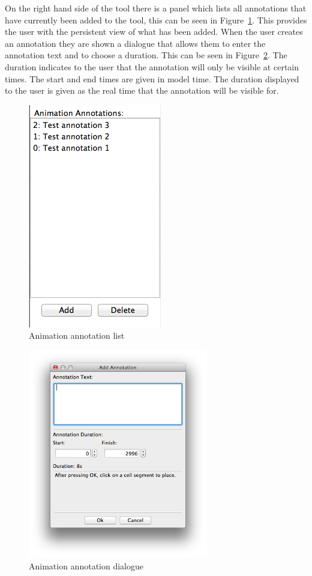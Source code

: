 On the right hand side of the tool there is a panel which lists all annotations that have currently been added to the tool, this can be seen in Figure~\ref{fig:annotation_list}.  This provides the user with the persistent view of what has been added.  When the user creates an annotation they are shown a dialogue that allows them to enter the annotation text and to choose a duration. This can be seen in Figure~\ref{fig:annotation_dialog}. The duration indicates to the user that the annotation will only be visible at certain times.  The start and end times are given in model time.  The duration displayed to the user is given as the real time that the annotation will be visible for.

\begin{figure}[h!]
    \centering
    \includegraphics[height=0.4\textheight]{images/annotation_list.png}
    \caption{Animation annotation list}
    \label{fig:annotation_list}
\end{figure}

\begin{figure}[h!]
    \centering
    \includegraphics[width=0.7\textwidth]{images/annotation_dialog.png}
    \caption{Animation annotation dialogue}
    \label{fig:annotation_dialog}
\end{figure}

